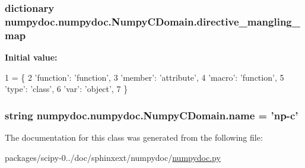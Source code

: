 \subsubsection[{directive\+\_\+mangling\+\_\+map}]{\setlength{\rightskip}{0pt plus 5cm}dictionary numpydoc.\+numpydoc.\+Numpy\+C\+Domain.\+directive\+\_\+mangling\+\_\+map\hspace{0.3cm}{\ttfamily [static]}}\label{classnumpydoc_1_1numpydoc_1_1NumpyCDomain_a1679e0bcc8492e2fa3e9ada95182d825}
{\bfseries Initial value\+:}
\begin{DoxyCode}
1 = \{
2         \textcolor{stringliteral}{'function'}: \textcolor{stringliteral}{'function'},
3         \textcolor{stringliteral}{'member'}: \textcolor{stringliteral}{'attribute'},
4         \textcolor{stringliteral}{'macro'}: \textcolor{stringliteral}{'function'},
5         \textcolor{stringliteral}{'type'}: \textcolor{stringliteral}{'class'},
6         \textcolor{stringliteral}{'var'}: \textcolor{stringliteral}{'object'},
7     \}
\end{DoxyCode}
\hypertarget{classnumpydoc_1_1numpydoc_1_1NumpyCDomain_aa1d36db4db36abad015e85a68c3226bf}{}
\subsubsection[{name}]{\setlength{\rightskip}{0pt plus 5cm}string numpydoc.\+numpydoc.\+Numpy\+C\+Domain.\+name = 'np-\/c'\hspace{0.3cm}{\ttfamily [static]}}\label{classnumpydoc_1_1numpydoc_1_1NumpyCDomain_aa1d36db4db36abad015e85a68c3226bf}


The documentation for this class was generated from the following file\+:\begin{DoxyCompactItemize}
\item 
packages/scipy-\/0../doc/sphinxext/numpydoc/\hyperlink{numpydoc_8py}{numpydoc.\+py}\end{DoxyCompactItemize}
